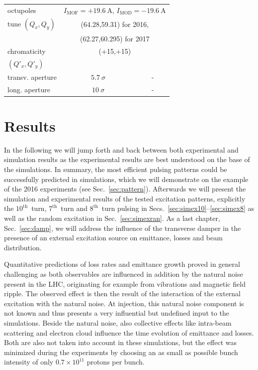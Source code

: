 \documentclass[%
 reprint,
 amsmath,amssymb,
 aps,
prstab,
longbibliography
]{revtex4-1}
\begin{document}
\begin{table}[h]
\begin{ruledtabular}
\begin{tabular}{lcc}
			octupoles  & \multicolumn{2}{c}{$I_{\mathrm{MOF}}=+19.6~\mathrm{A}$, $I_{\mathrm{MOD}}=-19.6~\mathrm{A}$}\\
			tune $(Q_x,Q_y)$ & \multicolumn{2}{c}{(64.28,59.31) for 2016,}\\
			& \multicolumn{2}{c}{(62.27,60.295) for 2017}\\
			chromaticity & \multicolumn{2}{c}{(+15,+15)}\\
			$(Q'_x,Q'_y)$ & & \\\hline
			transv. aperture & $5.7~\sigma$ & - \\
			long. aperture & $10~\sigma$ & - \\
		\end{tabular}
	\end{ruledtabular}
\end{table}



\section{Results}
\label{sec:simex}

In the following we will jump forth and back between both experimental and simulation results as the experimental results are best understood on the base of the simulations. In summary, the most efficient pulsing patterns could be successfully predicted in simulations, which we will demonstrate on the example of the 2016 experiments (see Sec.~\ref{sec:pattern}). Afterwards we will present the simulation and experimental results of the tested excitation patterns, explicitly the $10^{\mathrm{th}}$~turn, $7^{\mathrm{th}}$~turn and $8^{\mathrm{th}}$~turn pulsing in Secs.~\ref{sec:simex10}--\ref{sec:simex8} as well as the random excitation in Sec.~\ref{sec:simexran}. As a last chapter, Sec.~\ref{sec:damp}, we will address the influence of the transverse damper in the presence of an external excitation source on emittance, losses and beam distribution.

Quantitative predictions of loss rates and emittance growth proved in general challenging as both observables are influenced in addition by the natural noise present in the LHC, originating for example from vibrations and magnetic field ripple. The observed effect is then the result of the interaction of the external excitation with the natural noise. At injection, this natural noise component is not known and thus presents a very influential but undefined input to the simulations. Beside the natural noise, also collective effects like intra-beam scattering and electron cloud influence the time evolution of emittance and losses. Both are also not taken into account in these simulations, but the effect was minimized during the experiments by choosing an as small as possible bunch intensity of only $0.7\times10^{11}$ protons per bunch.
\end{document}
